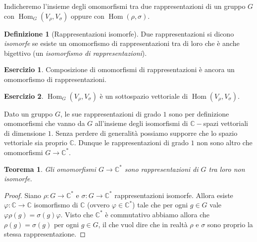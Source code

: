 \documentclass[11pt]{article}
\theoremstyle{plain}
\newtheorem{thm}{Teorema}[section]
\theoremstyle{definition}
\newtheorem{defn}{Definizione}[section]
\newtheorem{exercise}{Esercizio}[section]
\theoremstyle{remark}
\newcommand{\C}{\mathbb{C}}
\DeclareMathOperator{\Hom}{Hom}
\begin{document}
Indicheremo l'insieme degli omomorfismi tra due rappresentazioni di un gruppo $G$ con $\Hom_G(V_\rho, V_\sigma)$ oppure con $\Hom(\rho, \sigma)$.

\begin{defn}[Rappresentazioni isomorfe]
Due rappresentazioni si dicono \textit{isomorfe} se esiste un omomorfismo di rappresentazioni tra di loro che è anche bigettivo (un \emph{isomorfismo di rappresentazioni}).
\end{defn}

\begin{exercise}
Composizione di omomorfismi di rappresentazioni è ancora un omomorfismo di rappresentazioni.
\end{exercise}
\begin{exercise}
$\Hom_G(V_\rho, V_\sigma)$ è un sottospazio vettoriale di $\Hom(V_\rho, V_\sigma)$.
\end{exercise}


Dato un gruppo $G$, le sue rappresentazioni di grado $1$ sono per definizione
omomorfismi che vanno da $G$ all'insieme degli isomorfismi di $\C-$spazi vettoriali di dimensione $1$.
Senza perdere di generalità possiamo supporre che lo spazio vettoriale sia proprio $\C$. Dunque le
rappresentazioni di grado $1$ non sono altro che omomorfismi $G\to\C^*$.
\begin{thm}
Gli omomorfismi $G\to\C^*$ sono rappresentazioni di $G$ tra loro non isomorfe.
\end{thm}
\begin{proof}
Siano $\rho:G\to\C^*$ e $\sigma:G\to\C^*$ rappresentazioni isomorfe. Allora
esiste $\varphi:\C\to\C$ isomorfismo di $\C$ (ovvero $\varphi\in\C^*$) tale che per ogni $g\in G$ vale $\varphi \rho(g) = \sigma(g) \varphi$.
Visto che $\C^*$ è commutativo abbiamo allora che $\rho(g) = \sigma(g)$ per ogni $g\in G$, il che vuol dire che
in realtà $\rho$ e $\sigma$ sono proprio la stessa rappresentazione.
\end{proof}
\end{document}
